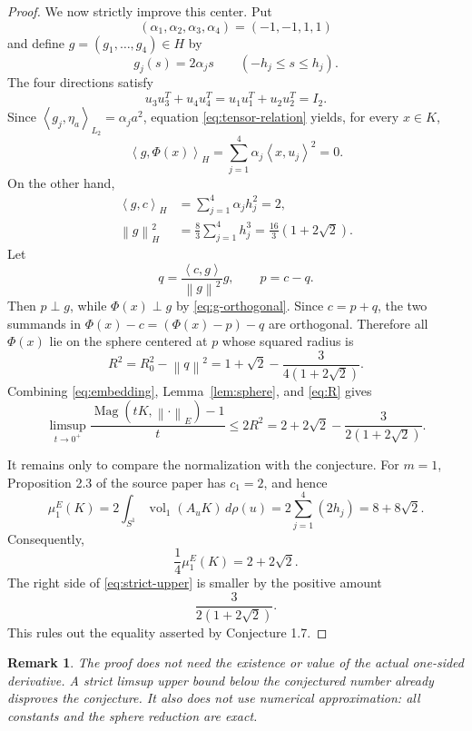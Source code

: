 \documentclass[11pt]{article}
\newtheorem{remark}{Remark}
\newcommand{\Mag}{\operatorname{Mag}}
\newcommand{\ip}[2]{\left\langle #1,#2\right\rangle}
\newcommand{\norm}[1]{\left\lVert #1\right\rVert}
\begin{document}
\begin{proof}
We now strictly improve this center. Put
\[
 (\alpha_1,\alpha_2,\alpha_3,\alpha_4)=(-1,-1,1,1)
\]
and define \(g=(g_1,\ldots,g_4)\in H\) by
\[
 g_j(s)=2\alpha_j s\qquad(-h_j\le s\le h_j).
\]
The four directions satisfy
\begin{equation}\label{eq:tensor-relation}
 u_3u_3^{T}+u_4u_4^{T}=u_1u_1^{T}+u_2u_2^{T}=I_2.
\end{equation}
Since
\(\ip{g_j}{\eta_a}_{L_2}=\alpha_j a^2\), equation
\eqref{eq:tensor-relation} yields, for every \(x\in K\),
\begin{equation}\label{eq:g-orthogonal}
 \ip{g}{\Phi(x)}_H
 =\sum_{j=1}^4\alpha_j\ip{x}{u_j}^2=0.
\end{equation}
On the other hand,
\begin{align}
 \ip{g}{c}_H
 &=\sum_{j=1}^4\alpha_jh_j^2=2,
 \label{eq:gc}\\
 \norm{g}_H^2
 &=\frac83\sum_{j=1}^4h_j^3
 =\frac{16}{3}(1+2\sqrt2).
 \label{eq:gnorm}
\end{align}
Let
\[
 q=\frac{\ip{c}{g}}{\norm{g}^2}g,
 \qquad p=c-q.
\]
Then \(p\perp g\), while \(\Phi(x)\perp g\) by
\eqref{eq:g-orthogonal}. Since \(c=p+q\), the two summands in
\(\Phi(x)-c=(\Phi(x)-p)-q\) are orthogonal. Therefore all \(\Phi(x)\)
lie on the sphere centered at \(p\) whose squared radius is
\begin{equation}\label{eq:R}
 R^2=R_0^2-\norm{q}^2
 =1+\sqrt2-\frac{3}{4(1+2\sqrt2)}.
\end{equation}
Combining \eqref{eq:embedding}, Lemma~\ref{lem:sphere}, and
\eqref{eq:R} gives
\begin{equation}\label{eq:strict-upper}
 \limsup_{t\to0^+}\frac{\Mag(tK,\norm{\cdot}_E)-1}{t}
 \le2R^2
 =2+2\sqrt2-\frac{3}{2(1+2\sqrt2)}.
\end{equation}

It remains only to compare the normalization with the conjecture. For
\(m=1\), Proposition 2.3 of the source paper has \(c_1=2\), and hence
\[
 \mu_1^E(K)
 =2\int_{S^1}\operatorname{vol}_1(A_uK)\,d\rho(u)
 =2\sum_{j=1}^4(2h_j)
 =8+8\sqrt2.
\]
Consequently,
\[
 \frac14\mu_1^E(K)=2+2\sqrt2.
\]
The right side of \eqref{eq:strict-upper} is smaller by the positive
amount
\[
 \frac{3}{2(1+2\sqrt2)}.
\]
This rules out the equality asserted by Conjecture 1.7.
\end{proof}

\begin{remark}
The proof does not need the existence or value of the actual one-sided
derivative. A strict limsup upper bound below the conjectured number already
disproves the conjecture. It also does not use numerical approximation: all
constants and the sphere reduction are exact.
\end{remark}
\end{document}

